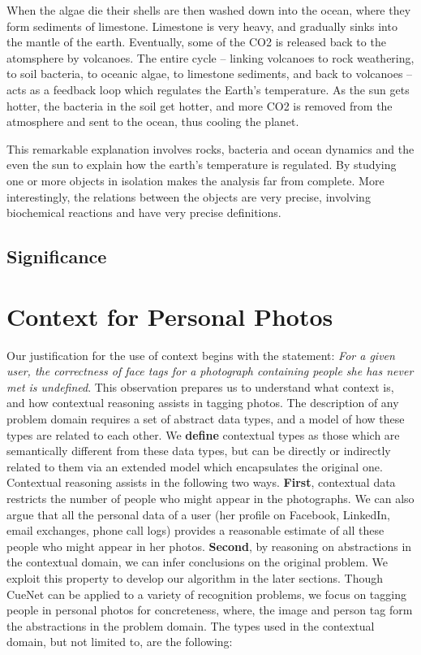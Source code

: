 When the algae die their shells are then washed down into the ocean, where they form sediments of limestone. Limestone is very heavy, and gradually sinks into the mantle of the earth. Eventually, some of the CO2 is released back to the atomsphere by volcanoes. The entire cycle -- linking volcanoes to rock weathering, to soil bacteria, to oceanic algae, to limestone sediments, and back to volcanoes -- acts as a feedback loop which regulates the Earth's temperature. As the sun gets hotter, the bacteria in the soil get hotter, and more CO2 is removed from the atmosphere and sent to the ocean, thus cooling the planet.

This remarkable explanation involves rocks, bacteria and ocean dynamics and the even the sun to explain how the earth's temperature is regulated. By studying one or more objects in isolation makes the analysis far from complete. More interestingly, the relations between the objects are very precise, involving biochemical reactions and have very precise definitions.

\subsection{Significance}

\section{Context for Personal Photos}
Our justification for the use of context begins with the statement: \textit{For a given user, the correctness of face tags for a photograph containing people she has never met is undefined}. This observation prepares us to understand what context is, and how contextual reasoning assists in tagging photos. The description of any problem domain requires a set of abstract data types, and a model of how these types are related to each other. We \textbf{define} contextual types as those which are semantically different from these data types, but can be directly or indirectly related to them via an extended model which encapsulates the original one. Contextual reasoning assists in the following two ways. \textbf{First}, contextual data restricts the number of people who might appear in the photographs. We can also argue that all the personal data of a user (her profile on Facebook, LinkedIn, email exchanges, phone call logs) provides a reasonable estimate of all these people who might appear in her photos. \textbf{Second}, by reasoning on abstractions in the contextual domain, we can infer conclusions on the original problem. We exploit this property to develop our algorithm in the later sections. Though CueNet can be applied to a variety of recognition problems, we focus on tagging people in personal photos for concreteness, where, the image and person tag form the abstractions in the problem domain. The types used in the contextual domain, but not limited to, are the following:

